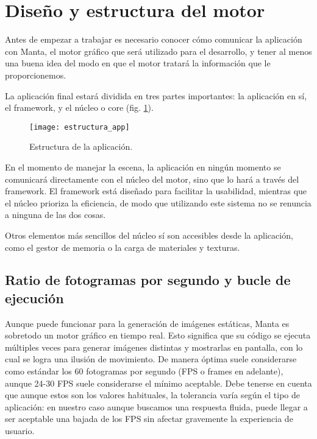 \section{Diseño y estructura del motor}
\label{engine_design}
Antes de empezar a trabajar es necesario conocer cómo comunicar la aplicación con Manta, el motor gráfico que será utilizado para el desarrollo, y tener al menos una buena idea del modo en que el motor tratará la información que le proporcionemos.

La aplicación final estará dividida en tres partes importantes: la aplicación en sí, el framework, y el núcleo o core (fig. \ref{fig:estructura_app}).

\begin{figure}[H]
    \centering
    \texttt{[image: estructura\_app]}
    \caption{Estructura de la aplicación.}
    \label{fig:estructura_app}
\end{figure}

En el momento de manejar la escena, la aplicación en ningún momento se comunicará directamente con el núcleo del motor, sino que lo hará a través del framework. El framework está diseñado para facilitar la usabilidad, mientras que el núcleo prioriza la eficiencia, de modo que utilizando este sistema no se renuncia a ninguna de las dos cosas.

Otros elementos más sencillos del núcleo sí son accesibles desde la aplicación, como el gestor de memoria o la carga de materiales y texturas.

\subsection{Ratio de fotogramas por segundo y bucle de ejecución}
\label{fps_bucle_ejecucion}
Aunque puede funcionar para la generación de imágenes estáticas, Manta es sobretodo un motor gráfico en tiempo real. Esto significa que su código se ejecuta múltiples veces para generar imágenes distintas y mostrarlas en pantalla, con lo cual se logra una ilusión de movimiento. De manera óptima suele considerarse como estándar los 60 fotogramas por segundo (FPS o frames en adelante), aunque 24-30 FPS suele considerarse el mínimo aceptable. Debe tenerse en cuenta que aunque estos son los valores habituales, la tolerancia varía según el tipo de aplicación: en nuestro caso aunque buscamos una respuesta fluida, puede llegar a ser aceptable una bajada de los FPS sin afectar gravemente la experiencia de usuario.

